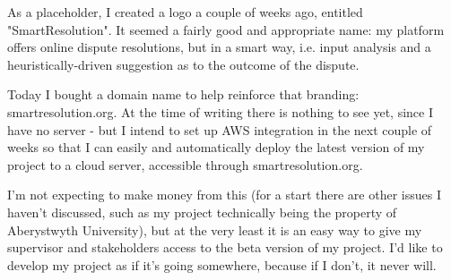 As a placeholder, I created a logo a couple of weeks ago, entitled "SmartResolution". It seemed a fairly good and appropriate name: my platform offers online dispute resolutions, but in a smart way, i.e. input analysis and a heuristically-driven suggestion as to the outcome of the dispute.

Today I bought a domain name to help reinforce that branding: smartresolution.org. At the time of writing there is nothing to see yet, since I have no server - but I intend to set up AWS integration in the next couple of weeks so that I can easily and automatically deploy the latest version of my project to a cloud server, accessible through smartresolution.org.

I'm not expecting to make money from this (for a start there are other issues I haven't discussed, such as my project technically being the property of Aberystwyth University), but at the very least it is an easy way to give my supervisor and stakeholders access to the beta version of my project. I'd like to develop my project as if it's going somewhere, because if I don't, it never will.